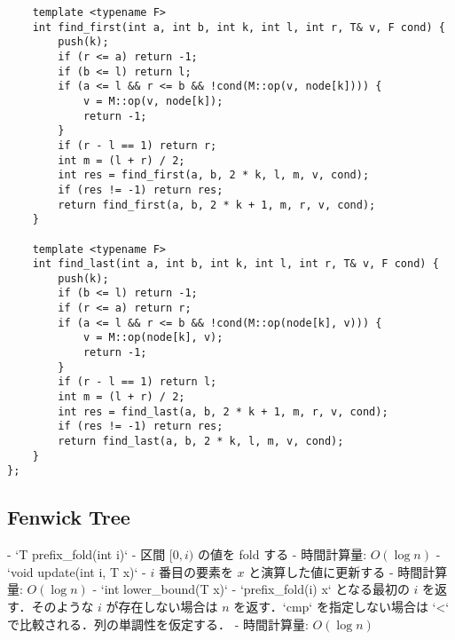 \begin{lstlisting}
    template <typename F>
    int find_first(int a, int b, int k, int l, int r, T& v, F cond) {
        push(k);
        if (r <= a) return -1;
        if (b <= l) return l;
        if (a <= l && r <= b && !cond(M::op(v, node[k]))) {
            v = M::op(v, node[k]);
            return -1;
        }
        if (r - l == 1) return r;
        int m = (l + r) / 2;
        int res = find_first(a, b, 2 * k, l, m, v, cond);
        if (res != -1) return res;
        return find_first(a, b, 2 * k + 1, m, r, v, cond);
    }

    template <typename F>
    int find_last(int a, int b, int k, int l, int r, T& v, F cond) {
        push(k);
        if (b <= l) return -1;
        if (r <= a) return r;
        if (a <= l && r <= b && !cond(M::op(node[k], v))) {
            v = M::op(node[k], v);
            return -1;
        }
        if (r - l == 1) return l;
        int m = (l + r) / 2;
        int res = find_last(a, b, 2 * k + 1, m, r, v, cond);
        if (res != -1) return res;
        return find_last(a, b, 2 * k, l, m, v, cond);
    }
};
\end{lstlisting}

\subsection{Fenwick Tree}

\begin{small}
\begin{markdown}
- `T prefix\_fold(int i)`
    - 区間 $[0, i)$ の値を fold する
    - 時間計算量: $O(\log n)$
- `void update(int i, T x)`
    - $i$ 番目の要素を $x$ と演算した値に更新する
    - 時間計算量: $O(\log n)$
- `int lower\_bound(T x)`
    - `prefix\_fold(i) \geq x` となる最初の $i$ を返す．そのような $i$ が存在しない場合は $n$ を返す．`cmp` を指定しない場合は `<` で比較される．列の単調性を仮定する．
    - 時間計算量: $O(\log n)$
\end{markdown}
\end{small}

